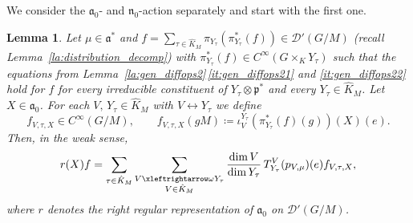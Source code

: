 \documentclass[JEP,XML,SOM,NoFloatCountersInSection,Unicode,published]{cedram}
\newtheorem{lemma}[theorem]{Lemma}
\theoremstyle{definition}
\newcommand{\fourier}[1]{\ensuremath{\sum_{\tau\in\hat K_M}\pi_{Y_\tau}(\pi_{Y_\tau}^*(#1))}}
\newcommand{\lraomega}{\ensuremath{\xleftrightarrow\omega}}
\newcommand{\mc}[1]{\ensuremath{\mathcal{#1}}}
\newcommand{\mf}[1]{\ensuremath{\mathfrak{#1}}}
\begin{document}
We consider the $\mf a_0$- and $\mf n_0$-action separately and start with the first one.
\begin{lemma}\label{la:a_action_gen_gradients_general}
Let $\mu\in\mf a^*$ and $f=\fourier{f}\in\mc D'(G/M)$ (recall Lem\-ma~\ref{la:distribution_decomp}) with $\pi_{Y_\tau}^*(f)\in C^\infty(G\times_KY_\tau)$ such that the equations from Lemma~\ref{la:gen_diffops2}\,\eqref{it:gen_diffops21} and \eqref{it:gen_diffops22} hold for $f$ for every irreducible constituent of $Y_\tau\otimes\mf p^*$ and every $Y_\tau\in\hat K_M$. Let $X\in\mf a_0$. For each $V,\,Y_\tau\in\hat K_M$ with $V\leftrightarrow Y_\tau$ we define
\[
f_{V,\tau,X}\in C^\infty(G/M),\qquad f_{V,\tau,X}(gM)\coloneqq\iota_V^{Y_{\tau}}(\pi_{Y_\tau}^*(f)(g))(X)(e).
\]
Then, in the weak sense,
\[
r(X)f=\sum_{\tau\in\hat K_M}\sum_{\substack{V\lraomega Y_\tau\\V\in\hat K_M}}\frac{\dim V}{\dim Y_\tau}\,T_{Y_{\tau}}^V(p_{V,\mu})(e)f_{V,\tau,X},
\]
where $r$ denotes the right regular representation of $\mf a_0$ on $\mc D'(G/M)$.
\end{lemma}
\end{document}
